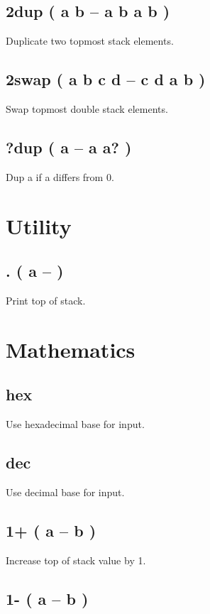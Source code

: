 \subsection{2dup ( a b -- a b a b )}

Duplicate two topmost stack elements.

\subsection{2swap ( a b c d -- c d a b )}

Swap topmost double stack elements.

\subsection{?dup ( a -- a a? )}

Dup a if a differs from 0.


\section{Utility}

\subsection{. ( a -- )}

Print top of stack.


\section{Mathematics}

\subsection{hex}

Use hexadecimal base for input.

\subsection{dec}

Use decimal base for input.

\subsection{1+ ( a -- b )}

Increase top of stack value by 1.

\subsection{1- ( a -- b )}

